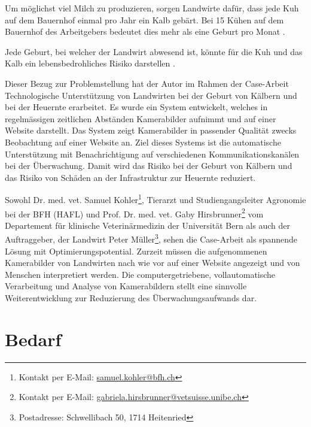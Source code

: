 Um möglichst viel Milch zu produzieren, sorgen Landwirte dafür, dass jede Kuh auf dem Bauernhof einmal pro Jahr ein Kalb gebärt. Bei 15 Kühen auf dem Bauernhof des Arbeitgebers bedeutet dies mehr als eine Geburt pro Monat \citep{Muller2019}.

Jede Geburt, bei welcher der Landwirt abwesend ist, könnte  für die Kuh und das Kalb ein lebensbedrohliches Risiko darstellen \citep{Muller2019}. 

Dieser Bezug zur Problemstellung hat der Autor im Rahmen der Case-Arbeit \flqq{}Technologische Unterstützung von Landwirten bei der Geburt von Kälbern und bei der Heuernte\frqq{} erarbeitet. Es wurde ein System entwickelt, welches in regelmässigen zeitlichen Abständen Kamerabilder aufnimmt und auf einer Website darstellt. Das System zeigt Kamerabilder in passender Qualität zwecks Beobachtung auf einer Website an. Ziel dieses Systems ist die automatische Unterstützung mit Benachrichtigung auf verschiedenen Kommunikationskanälen bei der Überwachung. Damit wird das Risiko bei der Geburt von Kälbern und das Risiko von Schäden an der Infrastruktur zur Heuernte reduziert.


Sowohl Dr. med. vet. Samuel Kohler\footnote{Kontakt per E-Mail: \url{samuel.kohler@bfh.ch}}, Tierarzt und Studiengangsleiter Agronomie bei der BFH (HAFL) und Prof. Dr. med. vet. Gaby Hirsbrunner\footnote{Kontakt per E-Mail: \url{gabriela.hirsbrunner@vetsuisse.unibe.ch}} vom Departement für klinische Veterinärmedizin der Universität Bern als auch der Auftraggeber, der Landwirt Peter Müller\footnote{Postadresse: Schwellibach 50, 1714 Heitenried}, sehen die Case-Arbeit als spannende Lösung mit Optimierungspotential. Zurzeit müssen die aufgenommenen Kamerabilder von Landwirten nach wie vor auf einer Website angezeigt und von Menschen interpretiert werden. Die computergetriebene, vollautomatische Verarbeitung und Analyse von Kamerabildern stellt eine sinnvolle Weiterentwicklung zur Reduzierung des Überwachungsaufwands dar. 

\section{Bedarf}

